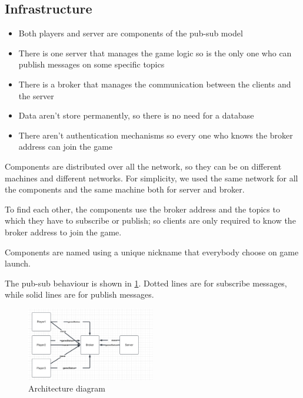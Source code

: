 \documentclass{scrartcl}
\begin{document}
\subsection{Infrastructure}\label{infrastructure}
\begin{itemize}
      \item Both players and server are components of the pub-sub model
      \item There is one server that manages the game logic so is the only one who can publish
            messages on some specific topics
      \item There is a broker that manages the communication between the clients and the server
      \item Data aren't store permanently, so there is no need for a database
      \item There aren't authentication mechanisms so every one who knows the broker address can join
            the game
\end{itemize}
Components are distributed over all the network, so they can be on different machines and different
networks. For simplicity, we used the same network for all the components and the same machine both
for server and broker.

To find each other, the components use the broker address and the topics to which they have to
subscribe or publish; so clients are only required to know the broker address to join the game.

Components are named using a unique nickname that everybody choose on game launch.

The pub-sub behaviour is shown in \cref{fig:pubsubdiagram}. Dotted lines are for subscribe messages,
while solid lines are for publish messages.

\begin{figure}
      \centering
      \includegraphics[width=0.5\textwidth]{figures/pubsubdiagram.png}
      \caption{Architecture diagram}
      \label{fig:pubsubdiagram}
\end{figure}
\end{document}
